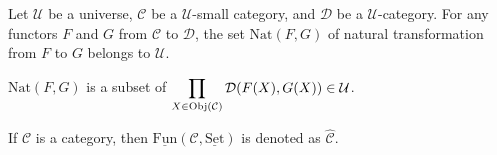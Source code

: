 \begin{propositionenv}
    Let $\mathcal{U}$ be a universe, $\mathcal{C}$ be a $\mathcal{U}$-small category, and $\mathcal{D}$ be a $\mathcal{U}$-category. For any functors $F$ and $G$ from $\mathcal{C}$ to $\mathcal{D}$, the set $\mathrm{Nat}(F,G)$ of natural transformation from $F$ to $G$ belongs to $\mathcal{U}$.
\end{propositionenv}
\begin{proofenv}
    $\mathrm{Nat}(F,G)$ is a subset of $\displaystyle \prod_{X\in \mathrm{Obj}(\mathcal{C})}\mathcal{D}(F(X),G(X))\in \mathcal{U}$.
\end{proofenv}
\begin{notationenv}
    If $\mathcal{C}$ is a category, then $\underline{\mathrm{Fun}}(\mathcal{C},\underline{\mathrm{Set}})$ is denoted as $\hat{\mathcal{C}}$.
\end{notationenv}

